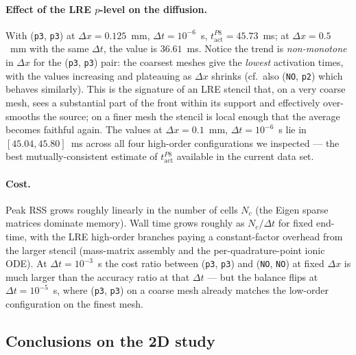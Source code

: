 \documentclass[11pt,a4paper]{article}
\newcommand{\code}[1]{\texttt{\small #1}}
\begin{document}
\paragraph{Effect of the LRE $p$-level on the diffusion.}
With (\code{p3}, \code{p3}) at $\Delta x = 0.125$~mm,
$\Delta t = 10^{-6}$~s, $t_{\text{act}}^{P8} = 45.73$~ms; at
$\Delta x = 0.5$~mm with the same $\Delta t$, the value is $36.61$~ms.
Notice the trend is \emph{non-monotone} in $\Delta x$ for the
(\code{p3}, \code{p3}) pair: the coarsest meshes give the
\emph{lowest} activation times, with the values increasing and
plateauing as $\Delta x$ shrinks (cf.\ also (\code{NO}, \code{p2})
which behaves similarly). This is the signature of an LRE stencil
that, on a very coarse mesh, sees a substantial part of the front
within its support and effectively over-smooths the source; on a
finer mesh the stencil is local enough that the average becomes
faithful again. The values at $\Delta x = 0.1$~mm,
$\Delta t = 10^{-6}$~s lie in $[45.04, 45.80]$~ms across all four
high-order configurations we inspected --- the best mutually-consistent
estimate of $t_{\text{act}}^{P8}$ available in the current data set.

\paragraph{Cost.}
Peak RSS grows roughly linearly in the number of cells
$N_{c}$ (the Eigen sparse matrices dominate memory). Wall time grows
roughly as $N_{c}/\Delta t$ for fixed end-time, with the LRE
high-order branches paying a constant-factor overhead from the larger
stencil (mass-matrix assembly and the per-quadrature-point ionic ODE).
At $\Delta t = 10^{-3}$~s the cost ratio between
(\code{p3}, \code{p3}) and (\code{NO}, \code{NO}) at fixed $\Delta x$
is much larger than the accuracy ratio at that $\Delta t$ --- but the
balance flips at $\Delta t = 10^{-5}$~s, where (\code{p3}, \code{p3})
on a coarse mesh already matches the low-order configuration on the
finest mesh.

\subsection{Conclusions on the 2D study}
\label{sec:results:conclusions}
\end{document}
